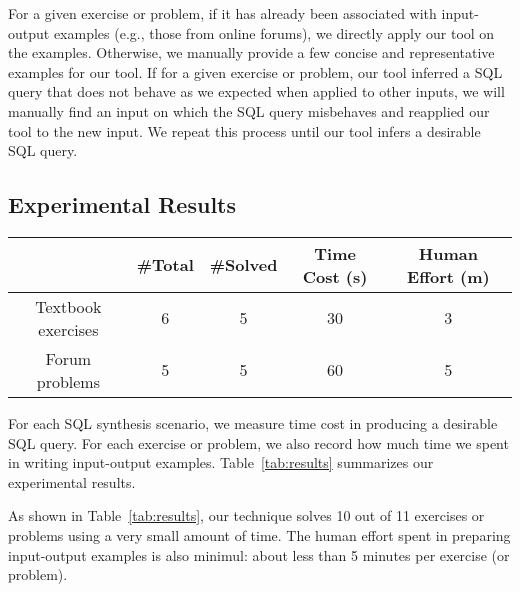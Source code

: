 For a given exercise or problem, if it
has already been associated with input-output examples (e.g.,
those from online forums), we directly apply our tool on the examples.
Otherwise, we manually provide a few concise and representative
examples for our tool.
If for a given exercise or problem, our tool inferred
a SQL query that does not behave as we expected when applied
to other inputs, we will manually find an input on which the
SQL query misbehaves and reapplied our tool to the new input. We
repeat this process until our tool infers a desirable SQL query.

\subsection{Experimental Results}

\begin{table}[t]
\setlength{\tabcolsep}{.14\tabcolsep}
\begin{tabular}{|c|c|c|c|c|}
\hline
 & \#Total& \#Solved& Time Cost (s) & Human Effort (m)\\
 \hline
 Textbook exercises &  6 &  5 &  30 & 3 \\
\hline
 Forum problems &  5 &  5  &  60 & 5\\
\hline
\end{tabular}

\end{table}

For each SQL synthesis scenario, we measure time cost in producing
a desirable SQL query. For each exercise or problem, we also record
how much time we spent in writing input-output examples.
Table~\ref{tab:results} summarizes our experimental results.

As shown in Table~\ref{tab:results}, our technique solves 10 out of 11 exercises or problems
using a very small amount of time. The human effort spent in preparing input-output examples
is also minimul: about less than 5 minutes per exercise (or problem).



